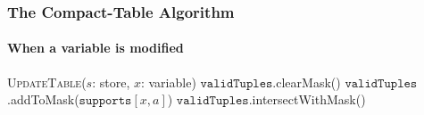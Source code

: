 \documentclass{beamer}
\newcommand{\Dom}[1]{\text{dom}({#1})}
\newcommand{\CurrTable}{\texttt{validTuples}}
\newcommand{\Supports}{\texttt{supports}}
\newcommand{\FOREACH}[1]{\FORALL{{#1} \textbf{do}}}
\newcommand{\ENDFOREACH}{\ENDFOR}
\def\PROCEDURE{\item[\textbf{PROCEDURE}]}
\def\UpdateTable{\textsc{UpdateTable}}
\begin{document}

\begin{frame}
  \frametitle{The Compact-Table Algorithm}
  \framesubtitle{When a variable is modified}
  \begin{algorithm}[H]
    \small
    \begin{algorithmic}[1]
        \PROCEDURE \UpdateTable($s$: store, $x$: variable) \label{line:updateTableDelta:1} 
        \STATE $\CurrTable$.clearMask() \label{line:updateTableDelta:4} 
          \FOREACH{$a \in s(x)$} \label{line:updateTableDelta:8} 
            \STATE $\CurrTable$.addToMask($\Supports[x,a]$) \label{line:updateTableDelta:9} 
          \ENDFOREACH      
        \STATE $\CurrTable$.intersectWithMask() \label{line:updateTable:10} 
    \end{algorithmic}
  \end{algorithm}
\end{frame}
\end{document}
